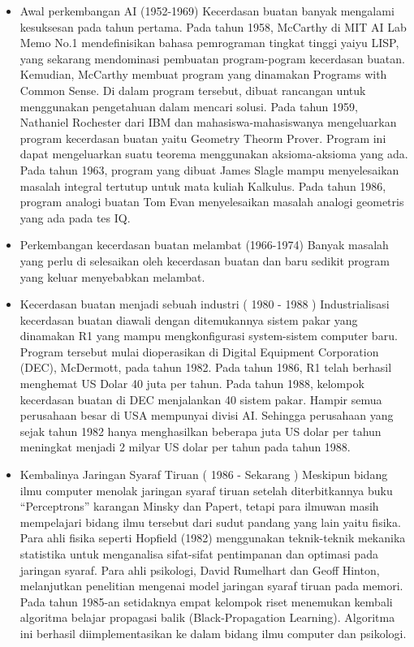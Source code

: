 \begin{enumerate}
\begin{itemize}
\item Awal perkembangan AI (1952-1969)
Kecerdasan buatan banyak mengalami kesuksesan pada tahun pertama. 
Pada tahun 1958, McCarthy di MIT AI Lab Memo No.1 mendefinisikan bahasa pemrograman tingkat tinggi yaiyu LISP, yang sekarang mendominasi pembuatan program-pogram kecerdasan buatan. Kemudian, McCarthy membuat program yang dinamakan Programs with Common Sense. Di dalam program tersebut, dibuat rancangan untuk menggunakan pengetahuan dalam mencari solusi.
Pada tahun 1959, Nathaniel Rochester dari IBM dan mahasiswa-mahasiswanya mengeluarkan program kecerdasan buatan yaitu Geometry Theorm Prover. Program ini dapat mengeluarkan suatu teorema menggunakan aksioma-aksioma yang ada.
Pada tahun 1963, program yang dibuat James Slagle mampu menyelesaikan masalah integral tertutup untuk mata kuliah Kalkulus.
Pada tahun 1986, program analogi buatan Tom Evan menyelesaikan masalah analogi geometris yang ada pada tes IQ.

\item Perkembangan kecerdasan buatan melambat (1966-1974)
Banyak masalah yang perlu di selesaikan oleh kecerdasan buatan dan baru sedikit program yang keluar menyebabkan melambat.

\item Kecerdasan buatan menjadi sebuah industri ( 1980 - 1988 )
Industrialisasi kecerdasan buatan diawali dengan ditemukannya sistem pakar yang dinamakan R1 yang mampu mengkonfigurasi system-sistem computer baru. Program tersebut mulai dioperasikan di Digital Equipment Corporation (DEC), McDermott, pada tahun 1982.
Pada tahun 1986, R1 telah berhasil menghemat US Dolar 40 juta per tahun.
Pada tahun 1988, kelompok kecerdasan buatan di DEC menjalankan 40 sistem pakar. Hampir semua perusahaan besar di USA mempunyai divisi AI. Sehingga perusahaan yang sejak tahun 1982 hanya menghasilkan beberapa juta US dolar per tahun meningkat menjadi 2 milyar US dolar per tahun pada tahun 1988.

\item Kembalinya Jaringan Syaraf Tiruan ( 1986 - Sekarang )
Meskipun bidang ilmu computer menolak jaringan syaraf tiruan setelah diterbitkannya buku “Perceptrons” karangan Minsky dan Papert, tetapi para ilmuwan masih mempelajari bidang ilmu tersebut dari sudut pandang yang lain yaitu fisika. Para ahli fisika seperti Hopfield (1982) menggunakan teknik-teknik mekanika statistika untuk menganalisa sifat-sifat pentimpanan dan optimasi pada jaringan syaraf. Para ahli psikologi, David Rumelhart dan Geoff Hinton, melanjutkan penelitian mengenai model jaringan syaraf tiruan pada memori.
Pada tahun 1985-an setidaknya empat kelompok riset menemukan kembali algoritma belajar propagasi balik (Black-Propagation Learning). Algoritma ini berhasil diimplementasikan ke dalam bidang ilmu computer dan psikologi.


\end{itemize}
\end{enumerate}
